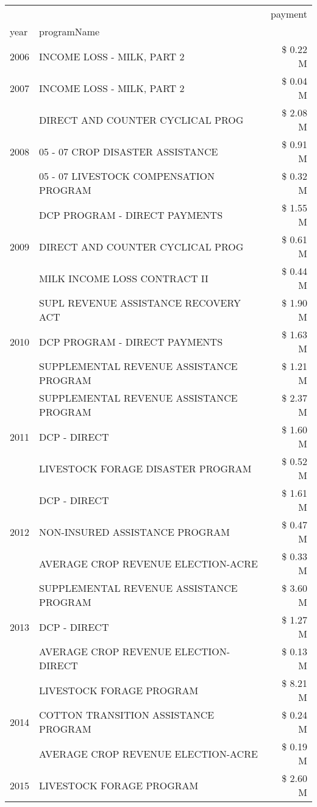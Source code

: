 \begin{tabular}{llr}
\toprule
 &  & payment \\
year & programName &  \\
\midrule
2006 & INCOME LOSS - MILK, PART 2 & \$ 0.22 M \\
\cline{1-3}
2007 & INCOME LOSS - MILK, PART 2 & \$ 0.04 M \\
\cline{1-3}
\multirow[t]{3}{*}{2008} & DIRECT AND COUNTER CYCLICAL PROG & \$ 2.08 M \\
 & 05 - 07 CROP DISASTER ASSISTANCE & \$ 0.91 M \\
 & 05 - 07 LIVESTOCK COMPENSATION PROGRAM & \$ 0.32 M \\
\cline{1-3}
\multirow[t]{3}{*}{2009} & DCP PROGRAM - DIRECT PAYMENTS & \$ 1.55 M \\
 & DIRECT AND COUNTER CYCLICAL PROG & \$ 0.61 M \\
 & MILK INCOME LOSS CONTRACT II & \$ 0.44 M \\
\cline{1-3}
\multirow[t]{3}{*}{2010} & SUPL REVENUE ASSISTANCE RECOVERY ACT & \$ 1.90 M \\
 & DCP PROGRAM - DIRECT PAYMENTS & \$ 1.63 M \\
 & SUPPLEMENTAL REVENUE ASSISTANCE PROGRAM & \$ 1.21 M \\
\cline{1-3}
\multirow[t]{3}{*}{2011} & SUPPLEMENTAL REVENUE ASSISTANCE PROGRAM & \$ 2.37 M \\
 & DCP - DIRECT & \$ 1.60 M \\
 & LIVESTOCK FORAGE DISASTER PROGRAM & \$ 0.52 M \\
\cline{1-3}
\multirow[t]{3}{*}{2012} & DCP - DIRECT & \$ 1.61 M \\
 & NON-INSURED ASSISTANCE PROGRAM & \$ 0.47 M \\
 & AVERAGE CROP REVENUE ELECTION-ACRE & \$ 0.33 M \\
\cline{1-3}
\multirow[t]{3}{*}{2013} & SUPPLEMENTAL REVENUE ASSISTANCE PROGRAM & \$ 3.60 M \\
 & DCP - DIRECT & \$ 1.27 M \\
 & AVERAGE CROP REVENUE ELECTION-DIRECT & \$ 0.13 M \\
\cline{1-3}
\multirow[t]{3}{*}{2014} & LIVESTOCK FORAGE PROGRAM & \$ 8.21 M \\
 & COTTON TRANSITION ASSISTANCE PROGRAM & \$ 0.24 M \\
 & AVERAGE CROP REVENUE ELECTION-ACRE & \$ 0.19 M \\
\cline{1-3}
\multirow[t]{3}{*}{2015} & LIVESTOCK FORAGE PROGRAM & \$ 2.60 M \\

\end{tabular}
